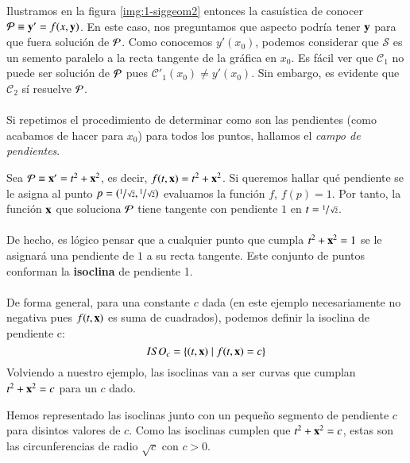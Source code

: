 Ilustramos en la figura \ref{img:1-siggeom2} entonces la casuística de conocer $\P \equiv \mbf{y'} = f(x,\mbf{y})$. En este caso, nos preguntamos que aspecto podría tener $\mbf{y}$ para que fuera solución de $\P$. Como conocemos $y'(x_0)$, podemos considerar que $\mathcal{S}$ es un semento paralelo a la recta tangente de la gráfica en $x_0$. Es fácil ver que $\mathcal{C}_1$ no puede ser solución de $\P$ pues $\mathcal{C}'_1(x_0) \neq y'(x_0)$. Sin embargo, es evidente que $\mathcal{C}_2$ sí resuelve $\P$.\\\\
Si repetimos el procedimiento de determinar como son las pendientes (como acabamos de hacer para $x_0$) para todos los puntos, hallamos el \textit{campo de pendientes}.

\begin{eg}\label{eg:campo-pendientes}
    Sea $\P \equiv \mbf{x'} = t^2 + \mbf{x}^2$, es decir, $f(t, \mbf{x}) = t^2 + \mbf{x}^2$. Si queremos hallar qué pendiente se le asigna al punto $p = (\sfrac{1}{\sqrt{2}},\sfrac{1}{\sqrt{2}})$ evaluamos la función $f$, $f(p) = 1$. Por tanto, la función $\mbf{x}$ que soluciona $\P$ tiene tangente con pendiente $1$ en $t = \sfrac{1}{\sqrt{2}}$.\\\\
    De hecho, es lógico pensar que a cualquier punto que cumpla $t^2 + \mbf{x}^2 = 1$ se le asignará una pendiente de $1$ a su recta tangente. Este conjunto de puntos conforman la \textbf{isoclina} de pendiente 1.\\\\
    De forma general, para una constante $c$ dada (en este ejemplo necesariamente no negativa pues $f(t, \mbf{x})$ es suma de cuadrados), podemos definir la isoclina de pendiente c:
    $$
    ISO_c = \left\{(t, \mbf{x}) \mid f(t, \mbf{x}) = c\right\}
    $$
    Volviendo a nuestro ejemplo, las isoclinas van a ser curvas que cumplan $t^2 + \mbf{x}^2 = c$ para un $c$ dado.\\
    \begin{minipage}[c]{0.3\linewidth}
      \begin{center}
      \end{center}
    \end{minipage}\hfill
    \begin{minipage}[c]{0.65\textwidth}
        Hemos representado las isoclinas junto con un pequeño segmento de pendiente $c$ para disintos valores de $c$. Como las isoclinas cumplen que $t^2 + \mbf{x}^2 = c$, estas son las circunferencias de radio $\sqrt{c}$ con $c > 0$.\\

\end{minipage}
\end{eg}
